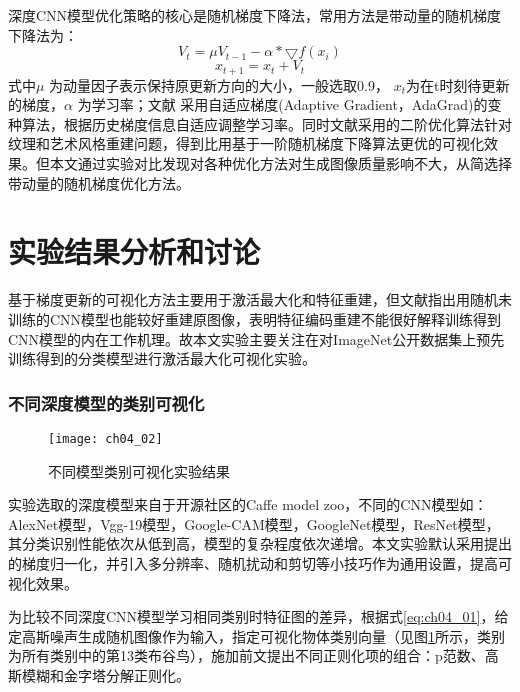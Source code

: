 深度CNN模型优化策略的核心是随机梯度下降法，常用方法是带动量的随机梯度下降法为：
\begin{equation} \label{eq:ch04_12}
      V_{t}=\mu V_{t-1} -\alpha *\bigtriangledown {f(x_{i})}
\end{equation}          
\begin{equation} \label{eq:ch04_13}
     x_{t+1}=x_{t}+V_{t}
\end{equation}       
式中$\mu$ 为动量因子表示保持原更新方向的大小，一般选取0.9， $x_{t}$为在t时刻待更新的梯度，$\alpha$ 为学习率；文献\citep{Mahendran2015d,Mahendran2015} 采用自适应梯度(Adaptive Gradient，AdaGrad)\citep{Duchi2011}的变种算法，根据历史梯度信息自适应调整学习率。同时文献采用的二阶优化算法针对纹理和艺术风格重建问题，得到比用基于一阶随机梯度下降算法更优的可视化效果。但本文通过实验对比发现对各种优化方法对生成图像质量影响不大，从简选择带动量的随机梯度优化方法。
\section{实验结果分析和讨论}
 
基于梯度更新的可视化方法主要用于激活最大化和特征重建，但文献指出用随机未训练的CNN模型也能较好重建原图像，表明特征编码重建不能很好解释训练得到CNN模型的内在工作机理。故本文实验主要关注在对ImageNet公开数据集上预先训练得到的分类模型进行激活最大化可视化实验。

\subsubsection{不同深度模型的类别可视化} 
\begin{figure}[!htbp]
\centering
\texttt{[image: ch04\_02]}
\caption{不同模型类别可视化实验结果}
\label{fig:ch04_02}
\end{figure}

实验选取的深度模型来自于开源社区的Caffe model zoo，不同的CNN模型如：AlexNet模型\citep{Krizhevsky2012}，Vgg-19模型\citep{Simonyan2014a}，Google-CAM模型\citep{Zhou2015}，GoogleNet模型\citep{Szegedy2015}，ResNet模型\citep{he15}，其分类识别性能依次从低到高，模型的复杂程度依次递增。本文实验默认采用提出的梯度归一化，并引入多分辨率、随机扰动和剪切等小技巧作为通用设置，提高可视化效果。


为比较不同深度CNN模型学习相同类别时特征图的差异，根据式\ref{eq:ch04_01}，给定高斯噪声生成随机图像作为输入，指定可视化物体类别向量（见图\ref{fig:ch04_02}所示，类别为所有类别中的第13类布谷鸟），施加前文提出不同正则化项的组合：p范数、高斯模糊和金字塔分解正则化。



